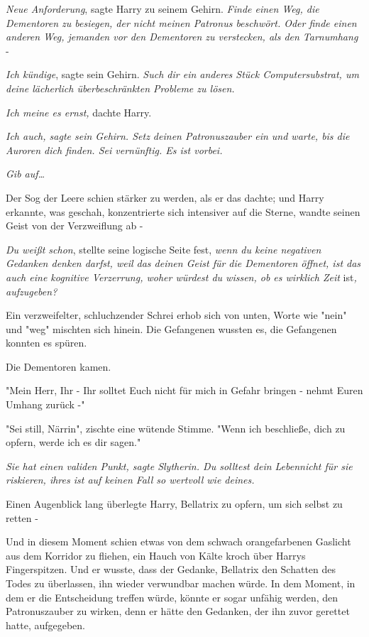 {\emph{Neue Anforderung}, sagte Harry zu seinem Gehirn. \emph{Finde einen Weg, die Dementoren zu besiegen, der nicht meinen Patronus beschwört. Oder finde einen anderen Weg, jemanden vor den Dementoren zu verstecken, als den Tarnumhang} -

\emph{Ich kündige}, sagte sein Gehirn. \emph{Such dir ein anderes Stück Computersubstrat, um deine lächerlich überbeschränkten Probleme zu lösen.}

\emph{Ich meine es ernst,} dachte Harry.

\emph{\emph{Ich auch}, sagte sein Gehirn. \emph{Setz deinen} \emph{Patronuszauber} \emph{ein und warte, bis die Auroren dich finden. Sei vernünftig. Es ist vorbei.}}

\emph{Gib auf…}

Der Sog der Leere schien stärker zu werden, als er das dachte; und Harry erkannte, was geschah, konzentrierte sich intensiver auf die Sterne, wandte seinen Geist von der Verzweiflung ab -

\emph{Du weißt schon}, stellte seine logische Seite fest, \emph{wenn du keine negativen Gedanken denken darfst, weil das deinen Geist für die Dementoren öffnet, ist das auch eine kognitive Verzerrung, woher würdest du wissen, ob es wirklich Zeit} ist\emph{, aufzugeben?}

Ein verzweifelter, schluchzender Schrei erhob sich von unten, Worte wie "nein" und "weg" mischten sich hinein. Die Gefangenen wussten es, die Gefangenen konnten es spüren.

Die Dementoren kamen.

"Mein Herr, Ihr - Ihr solltet Euch nicht für mich in Gefahr bringen - nehmt Euren Umhang zurück -"

"Sei still, Närrin", zischte eine wütende Stimme. "Wenn ich beschließe, dich zu opfern, werde ich es dir sagen."

\emph{\emph{Sie hat einen validen Punkt}, sagte Slytherin. \emph{Du solltest} \emph{dein Leben}nicht \emph{für sie riskieren, ihres} \emph{ist auf keinen Fall so wertvoll wie deines.}}

Einen Augenblick lang überlegte Harry, Bellatrix zu opfern, um sich selbst zu retten -

Und in diesem Moment schien etwas von dem schwach orangefarbenen Gaslicht aus dem Korridor zu fliehen, ein Hauch von Kälte kroch über Harrys Fingerspitzen. Und er wusste, dass der Gedanke, Bellatrix den Schatten des Todes zu überlassen, ihn wieder verwundbar machen würde. In dem Moment, in dem er die Entscheidung treffen würde, könnte er sogar unfähig werden, den Patronuszauber zu wirken, denn er hätte den Gedanken, der ihn zuvor gerettet hatte, aufgegeben.

}
